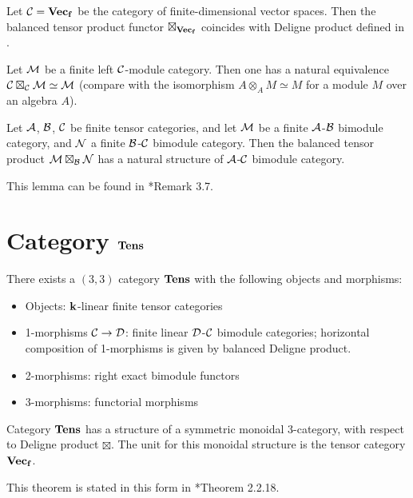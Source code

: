 \begin{example}\label{x:vecf-modules}
  Let $\mathcal{C}=\mathbf{Vec_f}$ be the category of finite-dimensional vector spaces.
  Then the balanced tensor product functor $\boxtimes_{\mathbf{Vec_f}}$ coincides with
  Deligne product defined in .
\end{example}

\begin{example}\label{x:module-dual-category}
  Let $\mathcal{M}$ be a finite left $\mathcal{C}$-module category. Then one has a natural
  equivalence $\mathcal{C}\boxtimes_{\mathcal{C}} \mathcal{M}\simeq \mathcal{M}$ (compare with the isomorphism
  $A\otimes_A M\simeq M$ for a module $M$ over an algebra $A$).
\end{example}

\begin{lemma}\label{l:bimodule-composition}
  Let $\mathcal{A}$, $\mathcal{B}$, $\mathcal{C}$ be finite tensor categories, and let
  $\mathcal{M}$ be a finite $\mathcal{A}$-$\mathcal{B}$ bimodule category, and $\mathcal{N}$ a finite
  $\mathcal{B}$-$\mathcal{C}$ bimodule category. Then the balanced tensor product
  $\mathcal{M}\boxtimes_{\mathcal{B}} \mathcal{N}$ has a natural structure of $\mathcal{A}$-$\mathcal{C}$
  bimodule category.
\end{lemma}
This lemma can be found in *{Remark 3.7}.

\section{Category $\mathbf{Tens}$}\label{s:tens-category}

\begin{theorem}\label{t:tens-exists}
  There exists a $(3, 3)$ category $\mathbf{Tens}$ with the following objects and
  morphisms:
  \begin{itemize}
    \item Objects: $\mathbf{k}$-linear finite tensor categories
    \item 1-morphisms $\mathcal{C}\to\mathcal{D}$: finite linear $\mathcal{D}$-$\mathcal{C}$ bimodule
      categories; horizontal composition of
      1-morphisms is given by balanced Deligne product.
    \item 2-morphisms: right exact bimodule functors
    \item 3-morphisms: functorial morphisms
  \end{itemize}
  Category
  $\mathbf{Tens}$ has a structure of a symmetric monoidal 3-category, with respect
  to Deligne product $\boxtimes$. The unit for this monoidal structure is the
  tensor category $\mathbf{Vec_f}$.
\end{theorem}
This theorem is stated in this form in
*{Theorem 2.2.18}.

